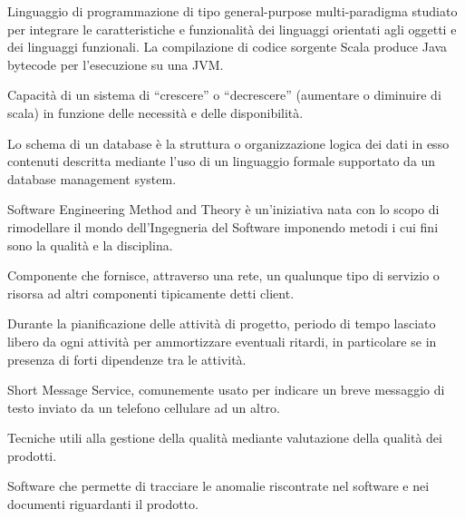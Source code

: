 \begin{itemize}


Linguaggio di programmazione di tipo general-purpose multi-paradigma studiato per integrare le caratteristiche e funzionalità dei linguaggi orientati agli oggetti e dei linguaggi funzionali. La compilazione di codice sorgente Scala produce Java bytecode per l'esecuzione su una JVM.


Capacità di un sistema di ``crescere'' o ``decrescere'' (aumentare o diminuire di scala) in funzione delle necessità e delle disponibilità.


Lo schema di un database è la struttura o organizzazione logica dei dati in esso contenuti descritta mediante l'uso di un linguaggio formale supportato da un database management system.


Software Engineering Method and Theory è un'iniziativa nata con lo scopo di rimodellare il mondo dell'Ingegneria del Software imponendo metodi i cui fini sono la qualità e la disciplina.


Componente che fornisce, attraverso una rete, un qualunque tipo di servizio o risorsa ad altri componenti tipicamente detti client.


Durante la pianificazione delle attività di progetto, periodo di tempo lasciato libero da ogni attività per ammortizzare eventuali ritardi, in particolare se in presenza di forti dipendenze tra le attività.


Short Message Service, comunemente usato per indicare un breve messaggio di testo inviato da un telefono cellulare ad un altro.


Tecniche utili alla gestione della qualità mediante valutazione della qualità dei prodotti.


Software che permette di tracciare le anomalie riscontrate nel software e nei documenti riguardanti il prodotto.



\end{itemize}
